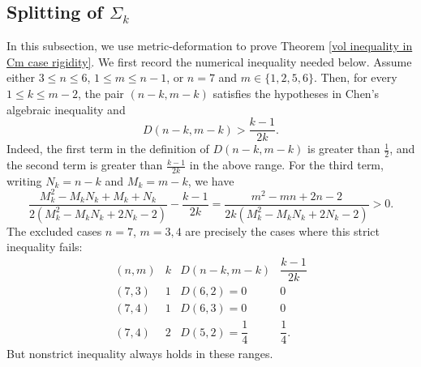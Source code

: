 \documentclass[11pt]{amsart}
\theoremstyle{definition}
\theoremstyle{remark}
\numberwithin{equation}{section}
\begin{document}
    \subsection{Splitting of $\Sigma_{k}$}\label{splitting-of-Sigma1}\label{deduction}
    In this subsection, we use metric-deformation to prove Theorem \ref{vol inequality in Cm case rigidity}.
    We first record the numerical inequality needed below. Assume either
      $3\leq n\leq 6$, $1\leq m\leq n-1$, or $n=7$ and $m\in\{1,2,5,6\}$. Then, for every
      $1\leq k\leq m-2$, the pair $(n-k,m-k)$ satisfies the hypotheses in Chen's algebraic
      inequality and
    \[
        D(n-k,m-k)>\frac{k-1}{2k}.
    \]
    Indeed, the first term in the definition of $D(n-k,m-k)$ is greater than $\frac12$, and the
      second term is greater than $\frac{k-1}{2k}$ in the above range. For the third term, writing
      $N_k=n-k$ and $M_k=m-k$, we have
    \[
    \frac{M_k^2-M_kN_k+M_k+N_k}{2(M_k^2-M_kN_k+2N_k-2)}
      -\frac{k-1}{2k}
      =
      \frac{m^2-mn+2n-2}{2k(M_k^2-M_kN_k+2N_k-2)}>0.
    \]
    The excluded cases $n=7$, $m=3,4$ are precisely the cases where this strict inequality fails:
    \[
    \begin{array}{c|c|c|c}
        (n,m) & k & D(n-k,m-k) & \dfrac{k-1}{2k} \\
        \hline
        (7,3) & 1 & D(6,2)=0 & 0 \\
        (7,4) & 1 & D(6,3)=0 & 0 \\
        (7,4) & 2 & D(5,2)=\dfrac14 & \dfrac14 .
    \end{array}
    \]
   But nonstrict inequality always holds in these ranges.
\end{document}
